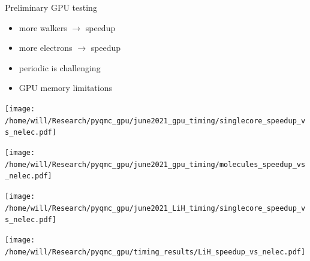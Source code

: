 \begin{frame}{Preliminary GPU testing}

\vspace{.02\textheight}
\begin{minipage}{0.32\textwidth}

\begin{itemize}[leftmargin=0em, itemsep=1em]
\item more walkers $\rightarrow$ speedup
\item more electrons $\rightarrow$ speedup
\item periodic is challenging
\item GPU memory limitations
\end{itemize}

\end{minipage}
\hspace{.01\textwidth}
\begin{minipage}{0.62\textwidth}
\begin{minipage}{0.51\textwidth}
\texttt{[image: /home/will/Research/pyqmc\_gpu/june2021\_gpu\_timing/singlecore\_speedup\_vs\_nelec.pdf]}

\texttt{[image: /home/will/Research/pyqmc\_gpu/june2021\_gpu\_timing/molecules\_speedup\_vs\_nelec.pdf]}
\end{minipage}
\hspace{.02\textwidth}
\begin{minipage}{0.39\textwidth}
\begin{center}
\texttt{[image: /home/will/Research/pyqmc\_gpu/june2021\_LiH\_timing/singlecore\_speedup\_vs\_nelec.pdf]}

\texttt{[image: /home/will/Research/pyqmc\_gpu/timing\_results/LiH\_speedup\_vs\_nelec.pdf]}
\end{center}
\end{minipage}
\end{minipage}
\end{frame}




